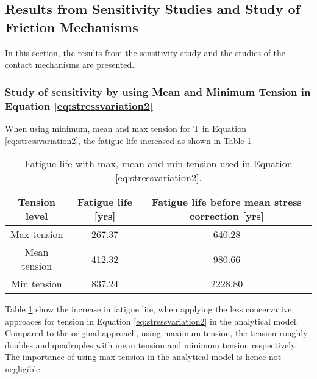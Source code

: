 \subsection{Results from Sensitivity Studies and Study of Friction Mechanisms}
In this section, the results from the sensitivity study and the studies of the contact mechanisms are presented. 
\subsubsection{Study of sensitivity by using Mean and Minimum Tension in Equation \ref{eq:stressvariation2}}
When using minimum, mean and max tension for T in Equation \ref{eq:stressvariation2}, the fatigue life increased as shown in Table \ref{table:maxmin}

\begin{table} [H]
\centering
\begin{tabular}{ |c|c|c|}
\hline
Tension level & Fatigue life [yrs] & Fatigue life before mean stress correction [yrs]\\ 
 \hline
 \hline
    Max tension & 267.37 & 640.28 \\ 
    Mean tension & 412.32 & 980.66 \\ 
    Min tension & 837.24 & 2228.80 \\ 
    \hline
\end{tabular}
\caption{Fatigue life with max, mean and min tension used in Equation \ref{eq:stressvariation2}.}
\label{table:maxmin}
\end{table} 
Table \ref{table:maxmin} show the increase in fatigue life, when applying the less concervative approaces for tension in Equation \ref{eq:stressvariation2} in the analytical model. Compared to the original approach, using maximum tension, the tension roughly doubles and quadruples with mean tension and minimum tension respectively. The importance of using max tension in the analytical model is hence not negligible. 
 
